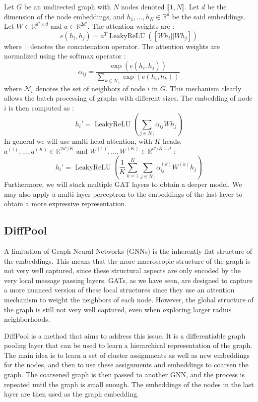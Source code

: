 \documentclass[switch, 11pt]{article}
\DeclareMathOperator{\leakyrelu}{LeakyReLU}
\newcommand{\R}{\mathbb{R}}
\begin{document}
\begin{multicols}{2}
    Let $G$ be an undirected graph with $N$ nodes denoted $\llbracket1, N\rrbracket$. Let $d$ be the dimension of the node embeddings, and $h_1,\dots,h_N\in\R^d$ be the said embeddings. Let $W\in\R^{d'\times d}$ and $a\in\R^{2d'}$. The attention weights are :
    \begin{equation}
        e(h_i,h_j) = a^T \leakyrelu([Wh_i || Wh_j])
    \end{equation}
    where $||$ denotes the concatenation operator. The attention weights are normalized using the softmax operator :
    \begin{equation}
        \alpha_{ij} = \frac{\exp(e(h_i,h_j))}{\sum_{k\in\mathcal{N}_i}\exp(e(h_i,h_k))}
    \end{equation}
    where $\mathcal{N}_i$ denotes the set of neighbors of node $i$ in $G$. This mechanism clearly allows the batch processing of graphs with different sizes. The embedding of node $i$ is then computed as :
    \begin{equation}
        h_i' = \leakyrelu\left(\sum_{j\in\mathcal{N}_i}\alpha_{ij}Wh_j\right)
    \end{equation}
    In general we will use multi-head attention, with $K$ heads, $a^{(1)},\dots,a^{(K)}\in\R^{2d'/K}$ and $W^{(1)},\dots,W^{(K)}\in\R^{d'/K\times d}$ :
    \begin{equation}
        h_i' = \leakyrelu\left(\frac{1}{K}\sum_{k=1}^K\sum_{j\in\mathcal{N}_i}\alpha_{ij}^{(k)}W^{(k)}h_j\right)
    \end{equation}
    Furthermore, we will stack multiple GAT layers to obtain a deeper model. We may also apply a multi-layer perceptron to the embeddings of the last layer to obtain a more expressive representation.


    \subsection{DiffPool}
    A limitation of Graph Neural Networks (GNNs) is the inherently flat structure of the embeddings. This means that the more macroscopic structure of the graph is not very well captured, since these structural aspects are only encoded by the very local message passing layers. GATs, as we have seen, are designed to capture a more nuanced version of these local structures since they use an attention mechanism to weight the neighbors of each node. However, the global structure of the graph is still not very well captured, even when exploring larger radius neighborhoods.

    DiffPool \cite{ying-2018} is a method that aims to address this issue. It is a differentiable graph pooling layer that can be used to learn a hierarchical representation of the graph. The main idea is to learn a set of cluster assignments as well as new embeddings for the nodes, and then to use these assignments and embeddings to coarsen the graph. The coarsened graph is then passed to another GNN, and the process is repeated until the graph is small enough. The embeddings of the nodes in the last layer are then used as the graph embedding.


\end{multicols}
\end{document}

